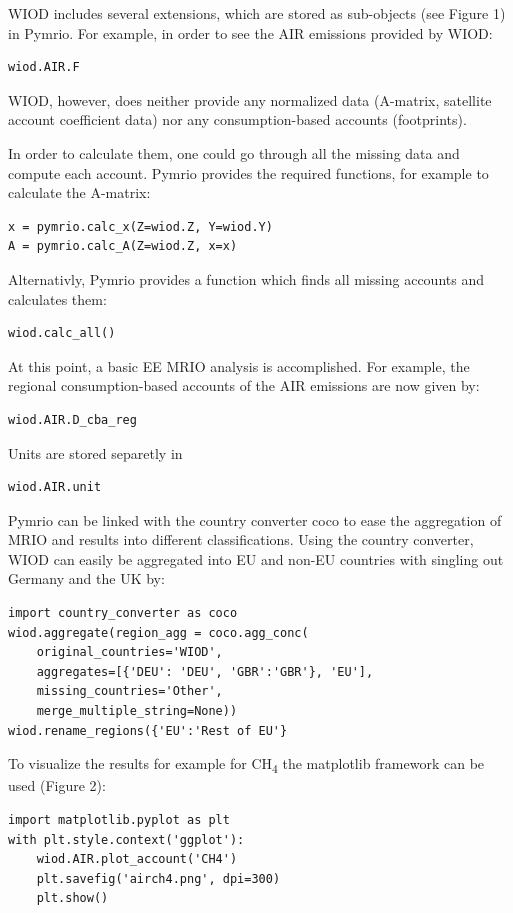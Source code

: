 \documentclass{jors}
\begin{document}
WIOD includes several extensions, which are stored as sub-objects (see Figure 1) in Pymrio. 
For example, in order to see the AIR emissions provided by WIOD:

\begin{lstlisting}
wiod.AIR.F
\end{lstlisting}

WIOD, however, does neither provide any normalized data (A-matrix, satellite account coefficient data) nor any consumption-based accounts (footprints).

In order to calculate them, one could go through all the missing data and compute each account. 
Pymrio provides the required functions, for example to calculate the A-matrix:
\begin{lstlisting}
x = pymrio.calc_x(Z=wiod.Z, Y=wiod.Y)
A = pymrio.calc_A(Z=wiod.Z, x=x)
\end{lstlisting}

Alternativly, Pymrio provides a function which finds all missing accounts and calculates them:
\begin{lstlisting}
wiod.calc_all()
\end{lstlisting}

At this point, a basic EE MRIO analysis is accomplished. For example, the regional consumption-based accounts of the AIR emissions are now given by:
\begin{lstlisting}
wiod.AIR.D_cba_reg
\end{lstlisting}

Units are stored separetly in 
\begin{lstlisting}
wiod.AIR.unit
\end{lstlisting}

Pymrio can be linked with the country converter coco \cite{stadler2017} to ease the aggregation of MRIO and results into different classifications.
Using the country converter, WIOD can easily be aggregated into EU and non-EU countries with singling out Germany and the UK by:

\begin{lstlisting}
import country_converter as coco
wiod.aggregate(region_agg = coco.agg_conc(
    original_countries='WIOD',
    aggregates=[{'DEU': 'DEU', 'GBR':'GBR'}, 'EU'],
    missing_countries='Other',
    merge_multiple_string=None))
wiod.rename_regions({'EU':'Rest of EU'}
\end{lstlisting}

To visualize the results for example for CH\textsubscript{4} the matplotlib framework \cite{hunter2007} can be used (Figure 2):
\begin{lstlisting}
import matplotlib.pyplot as plt
with plt.style.context('ggplot'):
    wiod.AIR.plot_account('CH4')
    plt.savefig('airch4.png', dpi=300)
    plt.show()
\end{lstlisting}
\end{document}
